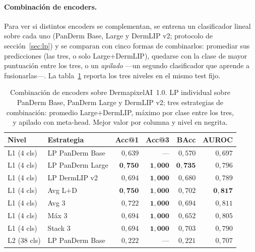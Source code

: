\paragraph{Combinación de encoders.}
Para ver si distintos encoders se complementan, se entrena un
clasificador lineal sobre cada uno (PanDerm Base, Large y DermLIP v2;
protocolo de sección~\ref{sec:lp}) y se comparan con cinco formas de
combinarlos: promediar sus predicciones (las tres, o solo
Large$+$DermLIP), quedarse con la clase de mayor puntuación entre los
tres, o un \emph{apilado} ---un segundo clasificador que aprende a
fusionarlas---. La
tabla~\ref{tab:dermapixel-ensemble} reporta los tres niveles en el
mismo test fijo.

\begin{table}[htbp]
\centering
\footnotesize
\setlength{\tabcolsep}{4pt}
\renewcommand{\arraystretch}{0.95}
\caption{Combinación de encoders sobre DermapixelAI~1.0. LP
individual sobre PanDerm Base, PanDerm Large y DermLIP v2; tres
estrategias de combinación: promedio Large$+$DermLIP, máximo por
clase entre los tres, y apilado con meta-head. Mejor valor por
columna y nivel en negrita.}
\label{tab:dermapixel-ensemble}
\begin{tabular}{llrrrr}
\hline
Nivel & Estrategia                         & Acc@1              & Acc@3              & BAcc               & AUROC \\
\hline
L1 (4 cls)   & LP PanDerm Base             & $0{,}639$          & ---                & $0{,}570$          & $0{,}697$ \\
L1 (4 cls)   & LP PanDerm Large            & $\mathbf{0{,}750}$ & $\mathbf{1{,}000}$ & $\mathbf{0{,}735}$ & $0{,}796$ \\
L1 (4 cls)   & LP DermLIP v2               & $0{,}694$          & $\mathbf{1{,}000}$ & $0{,}680$          & $0{,}789$ \\
L1 (4 cls)   & Avg L$+$D                   & $\mathbf{0{,}750}$ & $\mathbf{1{,}000}$ & $0{,}702$          & $\mathbf{0{,}817}$ \\
L1 (4 cls)   & Avg 3                       & $0{,}722$          & $\mathbf{1{,}000}$ & $0{,}694$          & $0{,}811$ \\
L1 (4 cls)   & Máx 3                       & $0{,}694$          & $\mathbf{1{,}000}$ & $0{,}652$          & $0{,}805$ \\
L1 (4 cls)   & Stack 3                     & $0{,}694$          & $\mathbf{1{,}000}$ & $0{,}703$          & $0{,}790$ \\
\hline
L2 (38 cls)  & LP PanDerm Base             & $0{,}222$          & ---                & $0{,}221$          & $0{,}707$ \\

\end{tabular}
\end{table}
